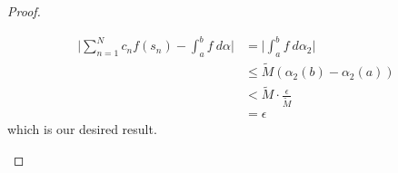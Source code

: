 \documentclass[a4paper]{article}
\begin{document}
\begin{proof}
\begin{enumerate}
\begin{align*}
       \Big| \sum_{ n=1  }^{ N  } {c}_{n} f({s}_{n}) - \int_{ a }^{ b }  f  \ d \alpha \Big| &= \Big| \int_{ a }^{ b }  f  \ d {\alpha}_{2} \Big|  \\
                                                                                             &\leq \tilde{M} ({\alpha}_{2}(b) - {\alpha}_{2}(a)) \\
                                                                                             &< \tilde{M}  \cdot \frac{ \epsilon }{ \tilde{M} }  \\
                                                                                             &= \epsilon
   \end{align*}
   which is our desired result.
\end{enumerate}
\end{proof}
\end{document}
